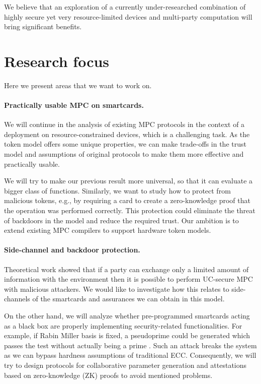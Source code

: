 \documentclass[
  digital, %
  twoside, %
  table,   %
  lof,     %
  lot,     %
]{fithesis3}
\newcounter{ph4_show_guides}
\theoremstyle{definition}
\theoremstyle{remark}
\begin{document}
We believe that an exploration of a currently under-researched combination of highly secure yet very resource-limited devices and multi-party computation will bring significant benefits.

\newpage
\section{Research focus}
Here we present areas that we want to work on.

\paragraph{Practically usable MPC on smartcards.}%
We will continue in the analysis of existing MPC protocols in the context of a deployment on resource-constrained devices, which is a challenging task.
As the token model offers some unique properties, we can make trade-offs in the trust model and assumptions of original protocols to make them more effective and practically usable. 

We will try to make our previous result \cite{2017-ccs-mavroudis} more universal, so that it can evaluate a bigger class of functions. Similarly, we want to study how to protect from malicious tokens, e.g., by requiring a card to create a zero-knowledge proof that the operation was performed correctly.  This protection could eliminate the threat of backdoors in the model and reduce the required trust.
Our ambition is to extend existing MPC compilers to support hardware token models.

\paragraph{Side-channel and backdoor protection.}%
Theoretical work \cite{DNW09} showed that if a party can exchange only a limited amount of information with the environment then it is possible to perform UC-secure MPC with malicious attackers. We would like to investigate how this relates to side-channels of the smartcards and assurances we can obtain in this model.

On the other hand, we will analyze whether pre-programmed smartcards acting as a black box are properly implementing security-related functionalities. For example, if Rabin Miller basis is fixed, a pseudoprime could be generated which passes the test without actually being a prime \cite{10.1007/978-3-540-30580-4_2}. Such an attack breaks the system as we can bypass hardness assumptions of traditional ECC. Consequently, we will try to design protocols for collaborative parameter generation and attestations based on zero-knowledge (ZK) proofs to avoid mentioned problems.
\end{document}
